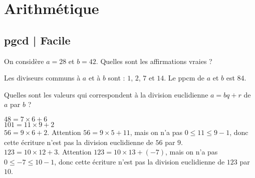 



\section{Arithmétique}


\subsection{pgcd | Facile}


\begin{question}
On considère $a = 28$ et $b = 42$. Quelles sont les affirmations vraies ?
    \begin{answers} 
    \end{answers}
    \begin{explanations} 
     Les diviseurs communs à $a$ et à $b$ sont : $1$, $2$, $7$ et $14$.
     Le ppcm de $a$ et $b$ est $84$.   
    \end{explanations}
\end{question}


\begin{question}
    Quelles sont les valeurs qui correspondent à la division euclidienne $a=bq+r$ de $a$ par $b$ ?
    \begin{answers}
    \end{answers}
    \begin{explanations} 
    $48 = 7 \times 6 + 6$ \\
    $101 = 11 \times 9 + 2$ \\
    $56 = 9 \times 6 + 2$. Attention $56 = 9 \times 5 + 11$, mais on n'a pas $0 \le 11 \le 9-1$, donc cette écriture n’est pas la division euclidienne de $56$ par $9$.\\  
    $123 = 10 \times 12 + 3$. Attention $123 = 10 \times 13 + (-7)$, mais on n'a pas $0 \le -7 \le 10-1$, donc cette écriture n’est pas la division euclidienne de $123$ par $10$.\\             
    \end{explanations}
\end{question}



